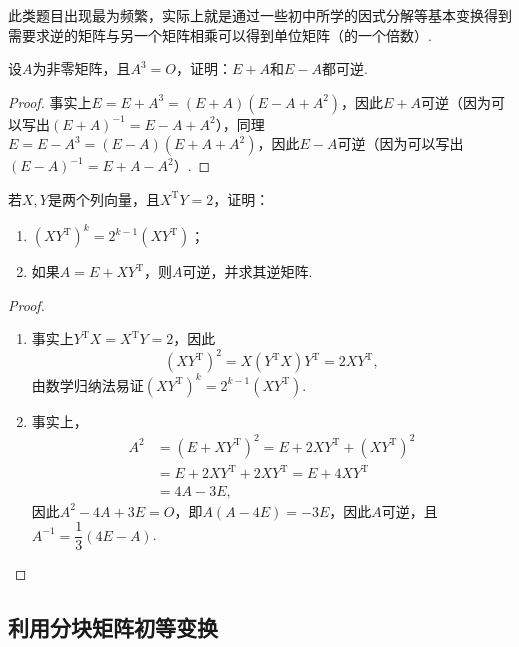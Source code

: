 此类题目出现最为频繁，实际上就是通过一些初中所学的因式分解等基本变换得到需要求逆的矩阵与另一个矩阵相乘可以得到单位矩阵（的一个倍数）.
\begin{example}{}{}
    设$A$为非零矩阵，且$A^3=O$，证明：$E+A$和$E-A$都可逆.
\end{example}

\begin{proof}
    事实上$E=E+A^3=(E+A)(E-A+A^2)$，因此$E+A$可逆（因为可以写出$(E+A)^{-1}=E-A+A^2$），同理$E=E-A^3=(E-A)(E+A+A^2)$，因此$E-A$可逆（因为可以写出$(E-A)^{-1}=E+A-A^2$）.
\end{proof}

\begin{example}{}{}
    若$X,Y$是两个列向量，且$X^\mathrm{T}Y=2$，证明：
    \begin{enumerate}
        \item $(XY^\mathrm{T})^k=2^{k-1}(XY^{\mathrm{T}})$；

        \item 如果$A=E+XY^\mathrm{T}$，则$A$可逆，并求其逆矩阵.
    \end{enumerate}
\end{example}

\begin{proof}
    \begin{enumerate}
        \item 事实上$Y^\mathrm{T}X=X^\mathrm{T}Y=2$，因此
              \[(XY^\mathrm{T})^2=X(Y^\mathrm{T}X)Y^\mathrm{T}=2XY^\mathrm{T},\]
              由数学归纳法易证$(XY^\mathrm{T})^k=2^{k-1}(XY^\mathrm{T})$.

        \item 事实上，
              \begin{align*}
                  A^2 & =(E+XY^\mathrm{T})^2=E+2XY^\mathrm{T}+(XY^\mathrm{T})^2 \\
                      & =E+2XY^\mathrm{T}+2XY^\mathrm{T}=E+4XY^\mathrm{T}       \\
                      & =4A-3E,
              \end{align*}
              因此$A^2-4A+3E=O$，即$A(A-4E)=-3E$，因此$A$可逆，且$A^{-1}=\dfrac{1}{3}(4E-A)$.
    \end{enumerate}
\end{proof}

\subsection{利用分块矩阵初等变换}

